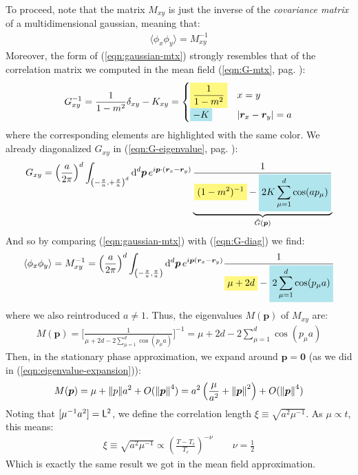 \documentclass[../../main.tex]{subfiles}
\begin{document}
\medskip

To proceed, note that the matrix $M_{xy}$ is just the inverse of the \textit{covariance matrix} of a multidimensional gaussian, meaning that:
\begin{align*}
    \langle \phi_x \phi_y \rangle = M_{xy}^{-1}
\end{align*} 
Moreover, the form of (\ref{eqn:gaussian-mtx}) strongly resembles that of the correlation matrix we computed in the mean field (\ref{eqn:G-mtx}, pag. \pageref{eqn:G-mtx}):
\begin{align*}
    G_{xy}^{-1} = \frac{1}{1-m^2} \delta_{xy} - K_{xy} = \begin{cases}
        \hlc{Yellow}{\frac{1}{1-m^2}} & x=y\\
        \hlc{SkyBlue}{-K} & |\bm{r}_x-\bm{r}_y| = a 
    \end{cases}  
\end{align*}
where the corresponding elements are highlighted with the same color. We already diagonalized $G_{xy}$ in (\ref{eqn:G-eigenvalue}, pag. \pageref{eqn:G-eigenvalue}):
\begin{align}\label{eqn:G-diag}
    G_{xy} = \left(\frac{a}{2\pi} \right)^{d} \int_{\left(-\frac{\pi}{a},+\frac{\pi}{a}  \right)^d} \dd[d]{\bm{p}} e^{i \bm{p} \cdot (\bm{r}_x - \bm{r}_y)} \underbrace{\frac{1}{\displaystyle \hlc{Yellow}{(1-m^2)^{-1}} - \hlc{SkyBlue}{2K \sum_{\mu=1}^d \cos(a p_\mu)}}}_{\tilde{G}(\bm{p})}
\end{align}
And so by comparing (\ref{eqn:gaussian-mtx}) with (\ref{eqn:G-diag}) we find:
\begin{align*}
    \langle \phi_x \phi_y \rangle = M_{xy}^{-1} = \left(\frac{a}{2\pi} \right)^d \int_{\left(-\frac{\pi}{a}, \frac{\pi}{a}\right)} \dd[d]{\bm{p}} e^{i \bm{p}(\bm{r}_x - \bm{r}_y)} \frac{1}{\displaystyle \hlc{Yellow}{\mu + 2d} - \hlc{SkyBlue}{2 \sum_{\mu=1}^d \cos(p_\mu a)}} 
\end{align*}
where we also reintroduced $a \neq 1$. Thus, the eigenvalues $M(\bm{p})$ of $M_{xy}$ are:
\begin{align*}
    M(\bm{p}) = \Big[\frac{1}{\mu + 2d - 2 \sum_{\mu=1}^d \cos(p_\mu a)} \Big]^{-1} = \mu + 2d - 2 \sum_{\mu=1}^d \cos(p_\mu a)
\end{align*}
Then, in the stationary phase approximation, we expand around $\bm{p} = \bm{0}$ (as we did in (\ref{eqn:eigenvalue-expansion})):
\begin{align*}
    M(\bm{p}) = \mu + \norm{p} a^2 + O(\norm{\bm{p}}^4) = a^2 \left(\frac{\mu}{a^2} + \norm{\bm{p}}^2 \right) + O(\norm{\bm{p}}^4)
\end{align*}
Noting that $[\mu^{-1} a^2] = \sf{L}^2$, we define the correlation length $\xi \equiv \sqrt{a^2 \mu^{-1}}$. As $\mu \propto t$, this means:
\begin{align*}
    \xi \equiv \sqrt{a^2 \mu^{-1}} \propto \left(\frac{T-T_c}{T_c} \right)^{-\nu} \qquad \nu = \frac{1}{2} 
\end{align*}
Which is exactly the same result we got in the mean field approximation.
\end{document}
